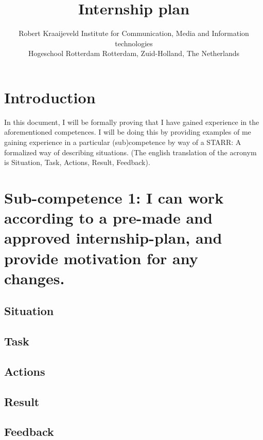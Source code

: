 \documentclass[11pt]{article}
\title{\Huge Internship plan}
\author{Robert Kraaijeveld 
	Institute for Communication, Media and Information technologies\\
	Hogeschool Rotterdam
	Rotterdam, Zuid-Holland, The Netherlands \\
	}
\begin{document}
\nocite{*}
\date{}
\maketitle
{}
\rhead{}
\lfoot{}
\cfoot{}

\newpage
\tableofcontents
\pagebreak

\newpage
{}
{}
\section*{Introduction}

In this document, I will be formally proving that I have gained experience in the aforementioned competences. I will be doing this by providing examples of me gaining experience in a particular (sub)competence by way of a STARR: A formalized way of describing situations. (The english translation of the acronym is Situation, Task, Actions, Result, Feedback).

\section{Sub-competence 1: I can work according to a pre-made and approved internship-plan, and provide motivation for any changes. } 
\subsection{Situation}

\subsection{Task}

\subsection{Actions}

\subsection{Result}

\subsection{Feedback}
\end{document}
